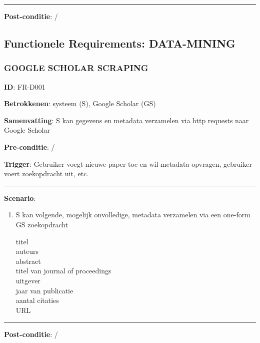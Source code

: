 \vspace{2 mm}
\hrule
\vspace{4 mm}


\noindent \textbf{Post-conditie}: / \\




\clearpage




\subsection{Functionele Requirements: DATA-MINING}
\vspace{4 mm}


\subsubsection{GOOGLE SCHOLAR SCRAPING}
\vspace{2 mm}

\textbf{ID}: FR-D001
\vspace{2 mm}

\noindent \textbf{Betrokkenen}: systeem (S), Google Scholar (GS)
\vspace{2 mm}

\noindent \textbf{Samenvatting}: S kan gegevens en metadata verzamelen via http requests naar Google Scholar  
\vspace{2 mm}

\noindent \textbf{Pre-conditie}: /
\vspace{2 mm}

\noindent \textbf{Trigger}: Gebruiker voegt nieuwe paper toe en wil metadata opvragen, gebruiker voert zoekopdracht uit, etc.
\vspace{4 mm}

\hrule
\vspace{2 mm}
\noindent \textbf{Scenario}:
\begin{enumerate}
\item S kan volgende, mogelijk onvolledige, metadata verzamelen via een one-form GS zoekopdracht 
\begin{description}
  \item[titel]  \hfill
  \item[auteurs] \hfill 
   \item[abstract] \hfill
   \item[titel van journal of proceedings ] \hfill 
    \item[uitgever] \hfill 
   \item[jaar van publicatie] \hfill 
    \item[aantal citaties] \hfill
   \item[URL] \hfill 
  \end{description}
\end{enumerate}

\vspace{2 mm}
\hrule
\vspace{4 mm}


\noindent \textbf{Post-conditie}: / \\


\clearpage





